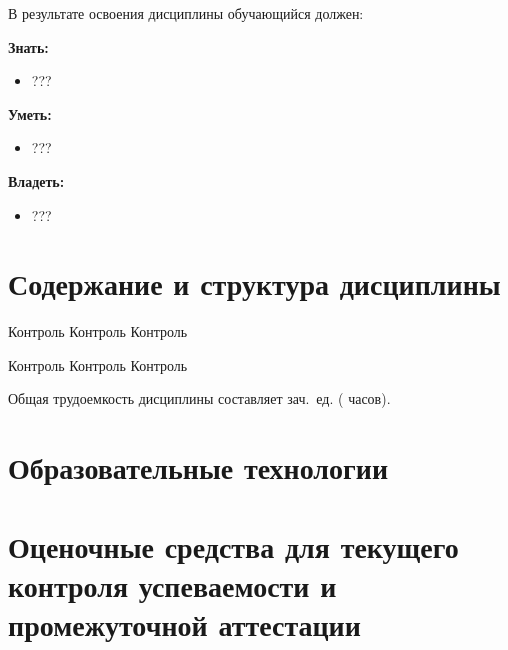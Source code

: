 В результате освоения дисциплины обучающийся должен:

\textbf{Знать:}
	\begin{itemize}
		\item ???
	\end{itemize}

\textbf{Уметь:}
	\begin{itemize}
		\item ???
	\end{itemize}

\textbf{Владеть:}
	\begin{itemize}
		\item ???
	\end{itemize}

\section{Содержание и структура дисциплины}
	
\mbox{}


	{\lipsum[1-2]}
	{Контроль Контроль Контроль}

	{\lipsum[3-4]}
	{Контроль Контроль Контроль}


	 Общая трудоемкость дисциплины составляет
	 зач.~ед. ( часов).



\section{Образовательные технологии}

\section{Оценочные средства для текущего контроля успеваемости и промежуточной аттестации}

